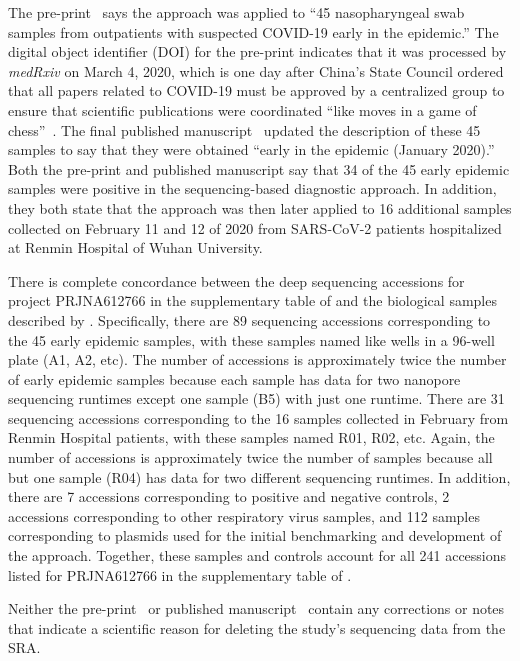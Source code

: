 \documentclass[9pt,twocolumn,twoside]{gsajnl_modified}
\begin{document}
The pre-print~\citep{Wang2020medRxiv} says the approach was applied to ``45 nasopharyngeal swab samples from outpatients with suspected COVID-19 early in the epidemic.''
The digital object identifier (DOI) for the pre-print indicates that it was processed by \textit{medRxiv} on March 4, 2020, which is one day after China's State Council ordered that all papers related to COVID-19 must be approved by a centralized group to ensure that scientific publications were coordinated ``like moves in a game of chess''~\citep{Kang2020}.
The final published manuscript~\citep{Wang2020small} updated the description of these 45 samples to say that they were obtained ``early in the epidemic (January 2020).''
Both the pre-print and published manuscript say that 34 of the 45 early epidemic samples were positive in the sequencing-based diagnostic approach.
In addition, they both state that the approach was then later applied to 16 additional samples collected on February 11 and 12 of 2020 from SARS-CoV-2 patients hospitalized at Renmin Hospital of Wuhan University.

There is complete concordance between the deep sequencing accessions for project PRJNA612766 in the supplementary table of \citet{farkas2020insights} and the biological samples described by \citet{Wang2020medRxiv}.
Specifically, there are 89 sequencing accessions corresponding to the 45 early epidemic samples, with these samples named like wells in a 96-well plate (A1, A2, etc).
The number of accessions is approximately twice the number of early epidemic samples because each sample has data for two nanopore sequencing runtimes except one sample (B5) with just one runtime.
 There are 31 sequencing accessions corresponding to the 16 samples collected in February from Renmin Hospital patients, with these samples named R01, R02, etc.
 Again, the number of accessions is approximately twice the number of samples because all but one sample (R04) has data for two different sequencing runtimes.
 In addition, there are 7 accessions corresponding to positive and negative controls, 2 accessions corresponding to other respiratory virus samples, and 112 samples corresponding to plasmids used for the initial benchmarking and development of the approach.
 Together, these samples and controls account for all 241 accessions listed for PRJNA612766 in the supplementary table of \citet{farkas2020insights}.

Neither the pre-print~\citep{Wang2020medRxiv} or published manuscript~\citep{Wang2020small} contain any corrections or notes that indicate a scientific reason for deleting the study's sequencing data from the SRA.
\end{document}
